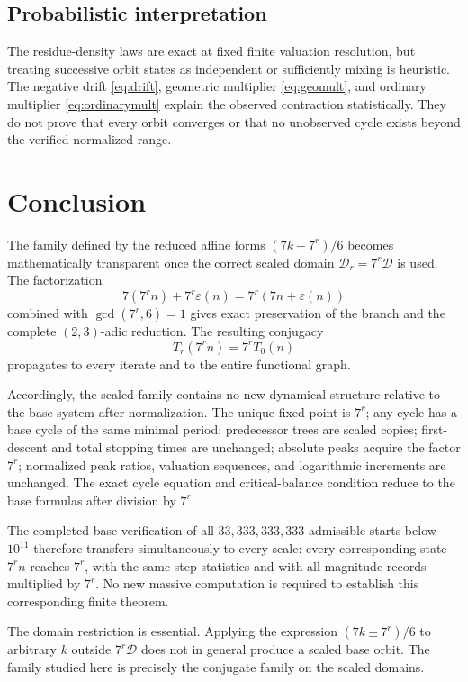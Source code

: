 \documentclass[11pt]{article}
\newcommand{\eps}{\varepsilon}
\begin{document}
\subsection*{Probabilistic interpretation}
The residue-density laws are exact at fixed finite valuation resolution, but treating successive orbit states as independent or sufficiently mixing is heuristic. The negative drift \eqref{eq:drift}, geometric multiplier \eqref{eq:geomult}, and ordinary multiplier \eqref{eq:ordinarymult} explain the observed contraction statistically. They do not prove that every orbit converges or that no unobserved cycle exists beyond the verified normalized range.

\section{Conclusion}
The family defined by the reduced affine forms $(7k\pm7^r)/6$ becomes mathematically transparent once the correct scaled domain $\mathcal D_r=7^r\mathcal D$ is used. The factorization
\[
7(7^rn)+7^r\eps(n)=7^r(7n+\eps(n))
\]
combined with $\gcd(7^r,6)=1$ gives exact preservation of the branch and the complete $(2,3)$-adic reduction. The resulting conjugacy
\[
T_r(7^rn)=7^rT_0(n)
\]
propagates to every iterate and to the entire functional graph.

Accordingly, the scaled family contains no new dynamical structure relative to the base system after normalization. The unique fixed point is $7^r$; any cycle has a base cycle of the same minimal period; predecessor trees are scaled copies; first-descent and total stopping times are unchanged; absolute peaks acquire the factor $7^r$; normalized peak ratios, valuation sequences, and logarithmic increments are unchanged. The exact cycle equation and critical-balance condition reduce to the base formulas after division by $7^r$.

The completed base verification of all $33,333,333,333$ admissible starts below $10^{11}$ therefore transfers simultaneously to every scale: every corresponding state $7^rn$ reaches $7^r$, with the same step statistics and with all magnitude records multiplied by $7^r$. No new massive computation is required to establish this corresponding finite theorem.

The domain restriction is essential. Applying the expression $(7k\pm7^r)/6$ to arbitrary $k$ outside $7^r\mathcal D$ does not in general produce a scaled base orbit. The family studied here is precisely the conjugate family on the scaled domains.
\end{document}
